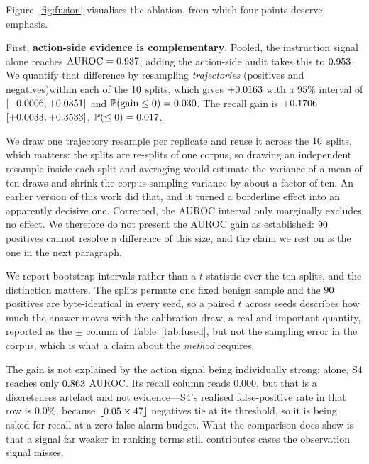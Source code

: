 \documentclass[pdflatex,sn-basic]{sn-jnl}%
\theoremstyle{thmstyleone}
\theoremstyle{thmstyletwo}
\theoremstyle{thmstylethree}
\newcommand{\Prob}{\mathbb{P}}
\begin{document}
Figure~\ref{fig:fusion} visualises the ablation, from which four points deserve
emphasis.

First, \textbf{action-side evidence is complementary}. Pooled, the instruction
signal alone reaches $\mathrm{AUROC} = 0.937$; adding the action-side
audit takes this to $0.953$. We quantify that difference by resampling
\emph{trajectories} (positives and negatives)within each of the $10$
splits, which gives $+0.0163$ with a $95\%$ interval of
$[-0.0006, +0.0351]$ and $\Prob(\text{gain} \le 0) =
\BootGainAurocP$. The recall gain is $+0.1706$
$[+0.0033, +0.3533]$, $\Prob(\le 0) = \BootGainTprP$.

We draw one trajectory resample per replicate and reuse it across the $10$
splits, which matters: the splits are re-splits of one corpus, so drawing an
independent resample inside each split and averaging would estimate the variance of
a mean of ten draws and shrink the corpus-sampling variance by about a factor of
ten. An earlier version of this work did that, and it turned a borderline effect
into an apparently decisive one. Corrected, the AUROC interval only marginally
excludes no effect. We therefore do not present the AUROC gain as
established: $90$ positives cannot resolve a difference of this size, and the
claim we rest on is the one in the next paragraph.

We report bootstrap intervals rather than a $t$-statistic over the ten splits, and
the distinction matters. The splits permute one fixed benign sample and the
$90$ positives are byte-identical in every seed, so a paired $t$ across seeds
describes how much the answer moves with the calibration draw, a real and
important quantity, reported as the $\pm$ column of Table~\ref{tab:fused}, but not
the sampling error in the corpus, which is what a claim about the \emph{method}
requires.

The gain is not explained by the action signal being individually strong: alone, S4
reaches only $0.863$ AUROC. Its recall column reads $0.000$, but that is a
discreteness artefact and not evidence---S4's realised false-positive rate in that
row is $0.0\%$, because $\lfloor 0.05 \times 47 \rfloor$ negatives tie at its
threshold, so it is being asked for recall at a zero false-alarm budget. What the
comparison does show is that a signal far weaker in ranking terms still contributes
cases the observation signal misses.
\end{document}
